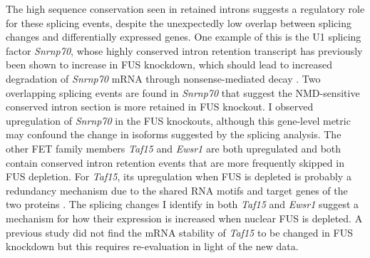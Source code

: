 The high sequence conservation seen in retained introns suggests a regulatory role for these splicing events, despite the unexpectedly low overlap between splicing changes and differentially expressed genes.
One example of this is the U1 splicing factor \textit{Snrnp70}, whose highly conserved intron retention transcript has previously been shown to increase in FUS knockdown, which should lead to increased degradation of \textit{Snrnp70} mRNA through nonsense-mediated decay \citep{Nakaya2013}. 
Two overlapping splicing events are found in \textit{Snrnp70} that suggest the NMD-sensitive conserved intron section is more retained in FUS knockout. 
I observed upregulation of \textit{Snrnp70} in the FUS knockouts, although this gene-level metric may confound the change in isoforms suggested by the splicing analysis. 
The other FET family members \textit{Taf15} and \textit{Ewsr1} are both upregulated and both contain conserved intron retention events that are more frequently skipped in FUS depletion.
For \textit{Taf15}, its upregulation when FUS is depleted is probably a redundancy mechanism due to the shared RNA motifs and target genes of the two proteins \citep{Ibrahim2013,Kapeli2016}. 
The splicing changes I identify in both \textit{Taf15} and \textit{Ewsr1} suggest a mechanism for how their expression is increased when  nuclear FUS is depleted.
A previous study did not find the mRNA stability of \textit{Taf15} to be changed in FUS knockdown \citep{Colombrita2012} but this requires re-evaluation in light of the new data.

